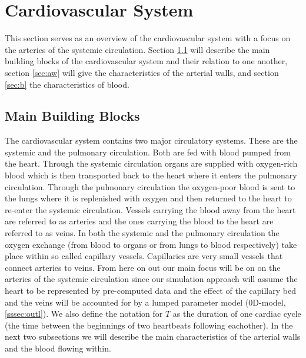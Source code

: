 \documentclass[a4paper, oneside]{discothesis}
\begin{document}


\chapter{Cardiovascular System} \label{chap:cvs}
This section serves as an overview of the cardiovascular system with a focus on the arteries of the systemic circulation. 
Section \ref{sec:mbb} will describe the main building blocks of the cardiovascular system and their relation to one another, section \ref{sec:aw} will give the characteristics of the arterial walls, and section \ref{sec:b} the characteristics of blood.
\section{Main Building Blocks} \label{sec:mbb}
The cardiovascular system contains two major circulatory systems.
These are the systemic and the pulmonary circulation. 
Both are fed with blood pumped from the heart.
Through the systemic circulation organs are supplied with oxygen-rich blood which is then transported back to the heart where it enters the pulmonary circulation.
Through the pulmonary circulation the oxygen-poor blood is sent to the lungs where it is replenished with oxygen and then returned to the heart to re-enter the systemic circulation.
Vessels carrying the blood away from the heart are referred to as arteries and the ones carrying the blood to the heart are referred to as veins.
In both the systemic and the pulmonary circulation the oxygen exchange (from blood to organs or from lungs to blood respectively) take place within so called capillary vessels.
Capillaries are very small vessels that connect arteries to veins. \cite{köppl2023dimension}
From here on out our main focus will be on on the arteries of the systemic circulation since our simulation approach will assume the heart to be represented by pre-computed data and the effect of the capillary bed and the veins will be accounted for by a lumped parameter model (0D-model, \autoref{sssec:outl}).
We also define the notation for $T$ as the duration of one cardiac cycle (the time between the beginnings of two heartbeats following eachother).
In the next two subsections we will describe the main characteristics of the arterial walls and the blood flowing within.
\end{document}
